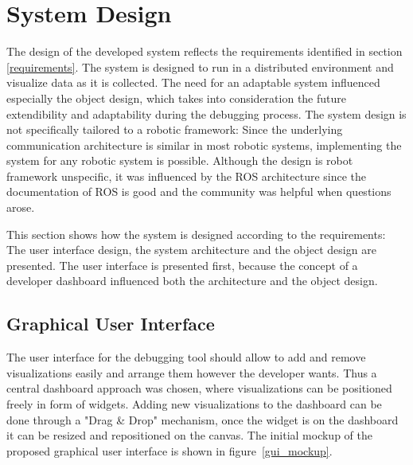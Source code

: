 \section{System Design}

The design of the developed system reflects the requirements identified in section \ref{requirements}. The system is designed to run in a distributed environment and visualize data as it is collected. The need for an adaptable system influenced especially the object design, which takes into consideration the future extendibility and adaptability during the debugging process. The system design is not specifically tailored to a robotic framework: Since the underlying communication architecture is similar in most robotic systems, implementing the system for any robotic system is possible.
Although the design is robot framework unspecific, it was influenced by the ROS architecture since the documentation of ROS is good and the community was helpful when questions arose. \q

This section shows how the system is designed according to the requirements: The user interface design, the system architecture and the object design are presented. The user interface is presented first, because the concept of a developer dashboard influenced both the architecture and the object design.

\subsection{Graphical User Interface}
\label{graphical_user_interface}
The user interface for the debugging tool should allow to add and remove visualizations easily and arrange them however the developer wants. Thus a central dashboard approach was chosen, where visualizations can be positioned freely in form of widgets. Adding new visualizations to the dashboard can be done through a "Drag \& Drop" mechanism, once the widget is on the dashboard it can be resized and repositioned on the canvas. The initial mockup of the proposed graphical user interface is shown in figure~\ref{gui_mockup}.

